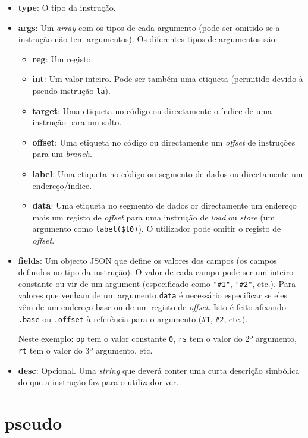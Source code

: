 \documentclass[11pt,a4paper,twoside,titlepage]{report}
\begin{document}
\begin{itemize}
	\item \textbf{type}: O tipo da instrução.
	\item \textbf{args}: Um \emph{array} com os tipos de cada argumento (pode ser
		omitido se a instrução não tem argumentos).
		Os diferentes tipos de argumentos são:
		\begin{itemize}
			\item \textbf{reg}: Um registo.
			\item \textbf{int}: Um valor inteiro. Pode ser também uma etiqueta
				(permitido devido à pseudo-instrução \verb+la+).
			\item \textbf{target}: Uma etiqueta no código ou directamente o índice de
				uma instrução para um salto.
			\item \textbf{offset}: Uma etiqueta no código ou directamente um
				\emph{offset} de instruções para um \emph{branch}.
			\item \textbf{label}: Uma etiqueta no código ou segmento de dados ou
				directamente um endereço/índice.
			\item \textbf{data}: Uma etiqueta no segmento de dados or directamente um
				endereço mais um registo de \emph{offset} para uma instrução de
				\emph{load} ou \emph{store} (um argumento como \verb+label($t0)+). O
				utilizador pode omitir o registo de \emph{offset}.
		\end{itemize}
	\item \textbf{fields}: Um objecto JSON que define os valores dos campos (os
		campos definidos no tipo da instrução). O valor de cada campo pode ser
		um inteiro constante ou vir de um argument (especificado como \verb+"#1"+,
		\verb+"#2"+, etc.).
		Para valores que venham de um argumento \verb+data+ é necessário especificar
		se eles vêm de um endereço base ou de um registo de \emph{offset}.
		Isto é feito afixando \verb+.base+ ou \verb+.offset+ à referência para o
		argumento (\verb+#1+, \verb+#2+, etc.).
		
		Neste exemplo: \verb+op+ tem o valor constante \verb+0+, \verb+rs+ tem
		o valor do 2º argumento, \verb+rt+ tem o valor do 3º argumento, etc.
	\item \textbf{desc}: Opcional. Uma \emph{string} que deverá conter uma
		curta descrição simbólica do que a instrução faz para o utilizador ver.
\end{itemize}


\section{pseudo}
\end{document}
